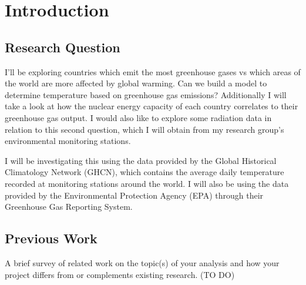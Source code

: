 \section{Introduction}
\subsection{Research Question}
I'll be exploring countries which emit the most greenhouse gases vs which areas of the world are more affected by global warming. Can we build a model to determine temperature based on greenhouse gas emissions? Additionally I will take a look at how the nuclear energy capacity of each country correlates to their greenhouse gas output. I would also like to explore some radiation data in relation to this second question, which I will obtain from my research group's environmental monitoring stations. 

I will be investigating this using the data provided by the Global Historical Climatology Network (GHCN), which contains the average daily temperature recorded at monitoring stations around the world. I will also be using the data provided by the Environmental Protection Agency (EPA) through their Greenhouse Gas Reporting System. 
\subsection{Previous Work}
A brief survey of related work on the topic(s) of your analysis and how your project differs from or complements existing research. (TO DO)